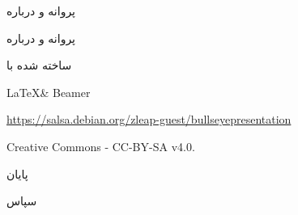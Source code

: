 \documentclass[hyperref={colorlinks}]{beamer}
\begin{document}
\begin{persian}
\begin{frame}{پروانه و درباره}
\begin{block}{پروانه و درباره}
{\centerline{ساخته شده با}}
{\centerline{\LaTeX \& Beamer}}
{\centerline{\url{https://salsa.debian.org/zleap-guest/bullseyepresentation}}}
{\centerline{Creative Commons - CC-BY-SA v4.0.}}
\end{block}

\end{frame}
\end{persian}


\begin{persian}
\begin{frame}
\begin{block}
\Huge{\centerline{پایان}}
\Huge{\centerline{سپاس}}
\end{block}
\end{frame}
\end{persian}
\end{document}
